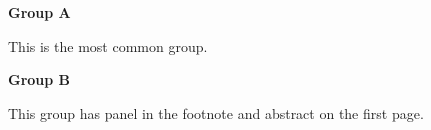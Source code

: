\documentclass[12pt]{article}
\begin{document}
\textbf{Group A}

This is the most common group.



\textbf{Group B}

This group has panel in the footnote and abstract on the first page.

\end{document}
